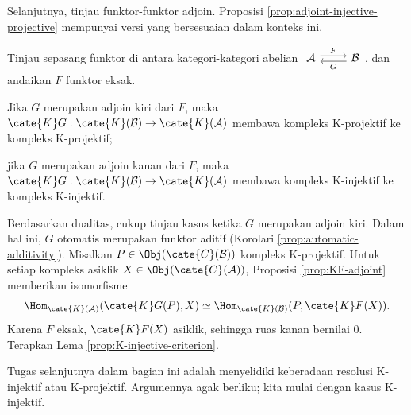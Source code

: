 Selanjutnya, tinjau funktor-funktor adjoin. Proposisi
\ref{prop:adjoint-injective-projective} mempunyai versi yang bersesuaian
dalam konteks ini.

\begin{proposisi}\label{prop:adjoint-injective-projectives-K}
	Tinjau sepasang funktor di antara kategori-kategori abelian
	$\begin{tikzcd}
		\mathcal{A} \arrow[r, shift left, "F"] &
		\mathcal{B} \arrow[l, shift left, "G"]
	\end{tikzcd}$,
	dan andaikan $F$ funktor eksak.
	\begin{compactitem}
		\item Jika $G$ merupakan adjoin kiri dari $F$, maka
		$\cate{K}G:\cate{K}(\mathcal{B})\to\cate{K}(\mathcal{A})$
		membawa kompleks K-projektif ke kompleks K-projektif;
		\item jika $G$ merupakan adjoin kanan dari $F$, maka
		$\cate{K}G:\cate{K}(\mathcal{B})\to\cate{K}(\mathcal{A})$
		membawa kompleks K-injektif ke kompleks K-injektif.
	\end{compactitem}
\end{proposisi}

\begin{bukti}
	Berdasarkan dualitas, cukup tinjau kasus ketika $G$ merupakan adjoin kiri.
	Dalam hal ini, $G$ otomatis merupakan funktor aditif (Korolari
	\ref{prop:automatic-additivity}). Misalkan
	$P\in\Obj(\cate{C}(\mathcal{B}))$ kompleks K-projektif. Untuk setiap
	kompleks asiklik $X\in\Obj(\cate{C}(\mathcal{A}))$, Proposisi
	\ref{prop:KF-adjoint} memberikan isomorfisme
	\[
	\Hom_{\cate{K}(\mathcal{A})}(\cate{K}G(P), X) \simeq
	\Hom_{\cate{K}(\mathcal{B})}(P, \cate{K}F(X)).
	\]
	Karena $F$ eksak, $\cate{K}F(X)$ asiklik, sehingga ruas kanan bernilai
	$0$. Terapkan Lema \ref{prop:K-injective-criterion}.
\end{bukti}

Tugas selanjutnya dalam bagian ini adalah menyelidiki keberadaan resolusi
K-injektif atau K-projektif. Argumennya agak berliku; kita mulai dengan kasus
K-injektif.


